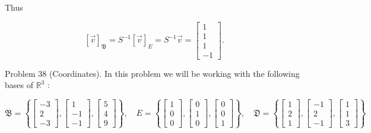 \documentclass[10pt]{article}
\begin{document}
Thus

$$
[\vec{v}]_{\mathfrak{B}}=S^{-1}[\vec{v}]_{E}=S^{-1} \vec{v}=\left[\begin{array}{c}
1 \\
1 \\
1 \\
-1
\end{array}\right] .
$$

Problem 38 (Coordinates). In this problem we will be working with the following bases of $\mathbb{R}^{3}$ :

$$
\mathfrak{B}=\left\{\left[\begin{array}{c}
-3 \\
2 \\
-3
\end{array}\right],\left[\begin{array}{c}
1 \\
-1 \\
-1
\end{array}\right],\left[\begin{array}{l}
5 \\
4 \\
9
\end{array}\right]\right\}, \quad E=\left\{\left[\begin{array}{l}
1 \\
0 \\
0
\end{array}\right],\left[\begin{array}{l}
0 \\
1 \\
0
\end{array}\right],\left[\begin{array}{l}
0 \\
0 \\
1
\end{array}\right]\right\}, \quad \mathfrak{D}=\left\{\left[\begin{array}{l}
1 \\
2 \\
1
\end{array}\right],\left[\begin{array}{c}
-1 \\
2 \\
-1
\end{array}\right],\left[\begin{array}{l}
1 \\
1 \\
3
\end{array}\right]\right\}
$$
\end{document}

